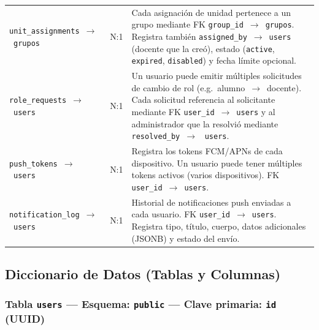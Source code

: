 \begin{table}[H]
\begin{tabularx}{\textwidth}{
        >{\raggedright\arraybackslash}p{4.0cm}
        >{\centering\arraybackslash}p{1.8cm}
        X}
        \texttt{unit\_assignments}~$\rightarrow$~\texttt{grupos} & N:1 &
            Cada asignación de unidad pertenece a un grupo mediante FK
            \texttt{group\_id}~$\rightarrow$~\texttt{grupos}. Registra también
            \texttt{assigned\_by}~$\rightarrow$~\texttt{users} (docente que la creó),
            estado (\texttt{active}, \texttt{expired}, \texttt{disabled}) y fecha
            límite opcional. \\[3pt]

        \rowcolor{azulFila}
        \texttt{role\_requests}~$\rightarrow$~\texttt{users} & N:1 &
            Un usuario puede emitir múltiples solicitudes de cambio de rol (e.g.\
            alumno~$\rightarrow$~docente). Cada solicitud referencia al solicitante
            mediante FK \texttt{user\_id}~$\rightarrow$~\texttt{users} y al
            administrador que la resolvió mediante \texttt{resolved\_by}~$\rightarrow$~%
            \texttt{users}. \\[3pt]

        \texttt{push\_tokens}~$\rightarrow$~\texttt{users} & N:1 &
            Registra los tokens FCM/APNs de cada dispositivo. Un usuario puede tener
            múltiples tokens activos (varios dispositivos). FK
            \texttt{user\_id}~$\rightarrow$~\texttt{users}. \\[3pt]

        \rowcolor{azulFila}
        \texttt{notification\_log}~$\rightarrow$~\texttt{users} & N:1 &
            Historial de notificaciones push enviadas a cada usuario. FK
            \texttt{user\_id}~$\rightarrow$~\texttt{users}. Registra tipo, título,
            cuerpo, datos adicionales (JSONB) y estado del envío. \\
        \bottomrule
    \end{tabularx}
\end{table}

\newpage
\subsection{Diccionario de Datos (Tablas y Columnas)}
\label{subsec:diccionario}

\subsubsection*{Tabla \texttt{users} \textnormal{---} Esquema: \texttt{public} \textnormal{---}
    Clave primaria: \texttt{id} (UUID)}

